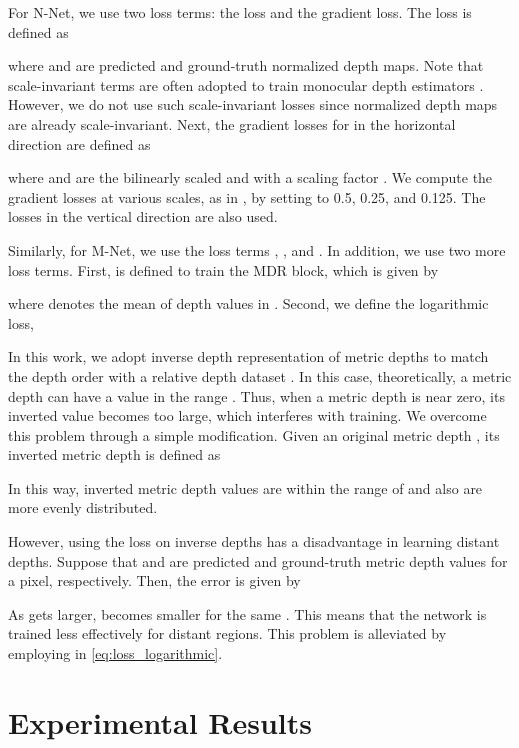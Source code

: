 \documentclass[runningheads]{llncs}
\begin{document}
For N-Net, we use two loss terms: the  loss and the gradient loss. The  loss is defined as

where  and  are predicted and ground-truth normalized depth maps. Note that scale-invariant terms are often adopted to train monocular depth estimators \cite{lee2019big, bhat2021adabins, ranftl2021vision}. However, we do not use such scale-invariant losses since normalized depth maps are already scale-invariant. Next, the gradient losses \cite{li2018megadepth, xian2020structure, hu2019revisiting} for  in the horizontal direction are defined as

where  and  are the bilinearly scaled  and  with a scaling factor . We compute the gradient losses at various scales, as in \cite{li2018megadepth, xian2020structure}, by setting  to 0.5, 0.25, and 0.125. The losses  in the vertical direction are also used.

Similarly, for M-Net, we use the loss terms , , and . In addition, we use two more loss terms. First,  is defined to train the MDR block, which is given by

where  denotes the mean of depth values in . Second, we define the logarithmic  loss,


In this work, we adopt inverse depth representation of metric depths to match the depth order with a relative depth dataset \cite{xian2020structure}. In this case, theoretically, a metric depth can have a value in the range . Thus, when a metric depth is near zero, its inverted value becomes too large, which interferes with training. We overcome this problem through a simple modification. Given an original metric depth , its inverted metric depth  is defined as

In this way, inverted metric depth values are within the range of  and also are more evenly distributed.

However, using the  loss  on inverse depths has a disadvantage in learning distant depths. Suppose that  and  are predicted and ground-truth metric depth values for a pixel, respectively. Then, the  error  is given by

As  gets larger,  becomes smaller for the same . This means that the network is trained less effectively for distant regions. This problem is alleviated by employing  in \eqref{eq:loss_logarithmic}.

\section{Experimental Results}
\label{sec:experimental_results}
\end{document}
